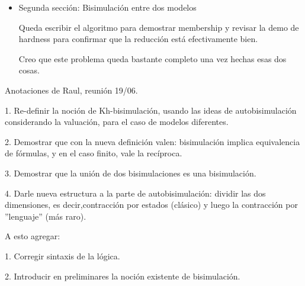 \begin{itemize}
\item Segunda sección: Bisimulación entre dos modelos

Queda escribir el algoritmo para demostrar membership y revisar la demo de hardness para confirmar que la reducción está efectivamente bien.

Creo que este problema queda bastante completo una vez hechas esas dos cosas.

\end{itemize}

Anotaciones de Raul, reunión 19/06.

1. Re-definir la noción de Kh-bisimulación, usando las ideas de autobisimulación considerando la valuación, para el caso de modelos diferentes.

2. Demostrar que con la nueva definición valen: bisimulación implica equivalencia de fórmulas, y en el caso finito, vale la recíproca.

3. Demostrar que la unión de dos bisimulaciones es una bisimulación.

4. Darle nueva estructura a la parte de autobisimulación: dividir las dos dimensiones, es decir,contracción por estados (clásico) y luego la contracción por ''lenguaje'' (más raro).

A esto agregar:

1. Corregir sintaxis de la lógica.

2. Introducir en preliminares la noción existente de bisimulación.